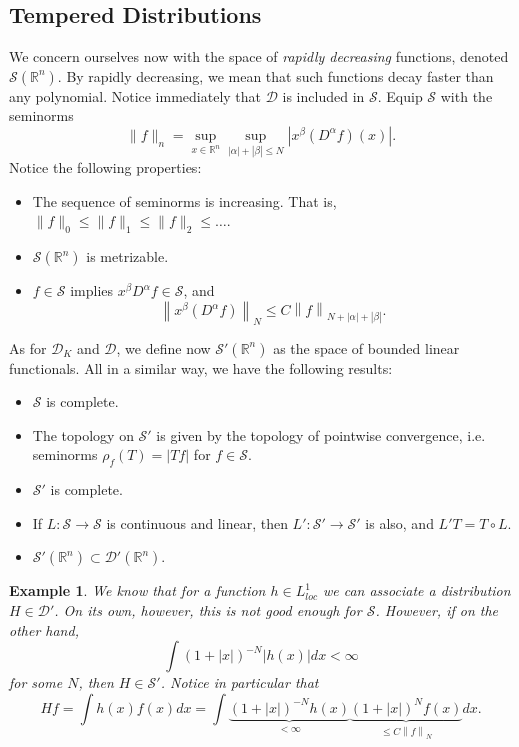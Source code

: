 \documentclass[letterpaper,twoside,11pt]{article}
\theoremstyle{mystyle}
\newtheorem*{ex}{Example}
\newcommand{\R}{{\mathbb R}}
\newcommand{\DD}{\mathcal D}
\begin{document}
\subsection{Tempered Distributions}
We concern ourselves now with the space of \textit{rapidly decreasing} functions, denoted $\mathcal S \left( \R^n \right)$. By rapidly decreasing, we mean that such functions decay faster than any polynomial. Notice immediately that $\DD$ is included in $\mathcal S$. Equip $\mathcal S$ with the seminorms 
\[\|f\|_n = \sup_{x \in \R^n} \sup_{|\alpha| + |\beta| \leq N} \left\vert x^\beta\left( D^\alpha f \right)(x) \right\vert.\]
Notice the following properties: 
\begin{itemize}
  \item The sequence of seminorms is increasing. That is, $\|f\|_0 \leq \|f\|_1 \leq \|f\|_2\leq \dots$.
  \item $\mathcal S\left( \R^n \right)$ is metrizable. 
  \item $f \in \mathcal S$ implies $x^\beta D^\alpha f \in \mathcal S$, and 
  \[{\left\| {{x^\beta }\left( {{D^\alpha }f} \right)} \right\|_N} \leqslant C{\left\| f \right\|_{N + \left| \alpha  \right| + \left| \beta  \right|}}.\]
\end{itemize}
As for $\DD_K$ and $\DD$, we define now $\mathcal S' \left( \R^n \right)$ as the space of bounded linear functionals. All in a similar way, we have the following results: 
\begin{itemize}
  \item $\mathcal S$ is complete. 
  \item The topology on $\mathcal S'$ is given by the topology of pointwise convergence, i.e. seminorms $\rho_f (T) = |Tf|$ for $f \in \mathcal S$. 
  \item $\mathcal S'$ is complete. 
  \item If $L : \mathcal S \to \mathcal S$ is continuous and linear, then $L' : \mathcal S' \to \mathcal S'$ is also, and $L'T = T\circ L$. 
  \item $\mathcal S'\left( \R^n \right) \subset\DD' \left( \R^n \right)$. 
\end{itemize}
\begin{ex}
  We know that for a function $h \in L^1_{loc}$ we can associate a distribution $H \in \DD'$. On its own, however, this is not good enough for $\mathcal S$. However, if on the other hand, 
  \[\int \left( 1+|x| \right)^{-N} |h(x)| dx < \infty\] for some $N$, then $H \in \mathcal S'$. Notice in particular that 
  \[Hf = \int {h\left( x \right)f\left( x \right)dx}  = \int {\underbrace {{{\left( {1 + \left| x \right|} \right)}^{ - N}}h\left( x \right)}_{ < \infty }\underbrace {{{\left( {1 + \left| x \right|} \right)}^N}f\left( x \right)}_{ \leqslant C{{\left\| f \right\|}_N}}dx}. \]
\end{ex}
\end{document}

